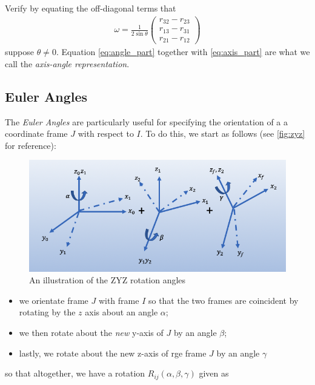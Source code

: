 \noindent 
\begin{homework}
	Verify by equating the off-diagonal terms that 
	\begin{align}
	\omega = \frac{1}{2 \sin \theta} \left(
	\begin{array}{c}
	r_{32} - r_{23} \\
	r_{13} - r_{31} \\
	r_{21} - r_{12}
	\end{array} \right)
	\label{eq:axis_part}
	\end{align}
	\noindent suppose $\theta \neq 0$. 
	Equation \eqref{eq:angle_part} together with \eqref{eq:axis_part} are what we call the \textit{axis-angle representation}.
\end{homework} 
%

\subsection{Euler Angles}
%
The \textit{Euler Angles} are particularly useful for specifying the orientation of a a coordinate frame $J$ with respect to $I$. To do this, we start as follows (see \autoref{fig:zyz} for reference):
%
\begin{figure}[tb!]
	\centering
	\includegraphics[width=.8\columnwidth]{figures/zyz.png}
	\caption{An illustration of the ZYZ rotation angles}
	\label{fig:zyz}
\end{figure}
\begin{itemize}
	\item we orientate frame $J$ with frame $I$ so that the two frames are coincident by rotating by the $z$ axis about an angle $\alpha$;
	\item we then rotate about the \textit{new} y-axis of $J$ by an angle $\beta$;
	\item lastly, we rotate about the new z-axis of rge frame $J$ by an angle $\gamma$ 
\end{itemize}
%
so that altogether, we have a rotation $R_{ij}(\alpha, \beta, \gamma)$ given as 
%
